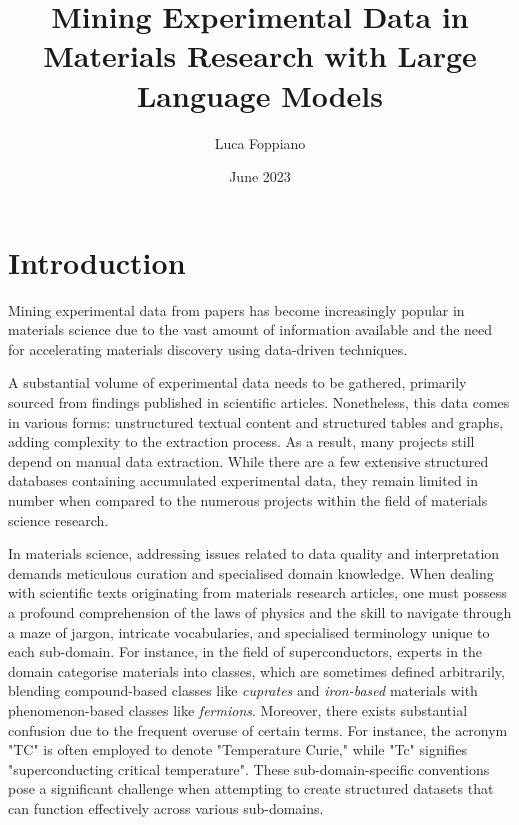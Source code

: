 \documentclass[a4paper]{article}
\title{Mining Experimental Data in Materials Research with Large Language Models}
\author{Luca Foppiano}
\date{June 2023}
\begin{document}
\maketitle

\section{Introduction}

Mining experimental data from papers has become increasingly popular in materials science due to the vast amount of information available and the need for accelerating materials discovery using data-driven techniques.

A substantial volume of experimental data needs to be gathered, primarily sourced from findings published in scientific articles.
Nonetheless, this data comes in various forms: unstructured textual content and structured tables and graphs, adding complexity to the extraction process. 
As a result, many projects still depend on manual data extraction.
While there are a few extensive structured databases containing accumulated experimental data, they remain limited in number when compared to the numerous projects within the field of materials science research.

In materials science, addressing issues related to data quality and interpretation demands meticulous curation and specialised domain knowledge.
When dealing with scientific texts originating from materials research articles, one must possess a profound comprehension of the laws of physics and the skill to navigate through a maze of jargon, intricate vocabularies, and specialised terminology unique to each sub-domain. 
For instance, in the field of superconductors, experts in the domain categorise materials into classes, which are sometimes defined arbitrarily, blending compound-based classes like \textit{cuprates} and \textit{iron-based} materials with phenomenon-based classes like \textit{fermions}. 
Moreover, there exists substantial confusion due to the frequent overuse of certain terms. For instance, the acronym "TC" is often employed to denote "Temperature Curie," while "Tc" signifies "superconducting critical temperature". 
These sub-domain-specific conventions pose a significant challenge when attempting to create structured datasets that can function effectively across various sub-domains.
\end{document}
